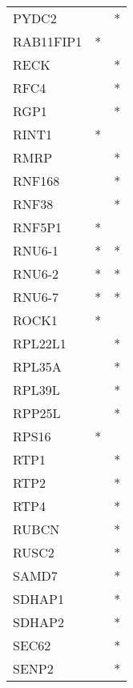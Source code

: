 \begin{longtable}{lcc}
PYDC2            &                &          * \\
RAB11FIP1        &              * &            \\
RECK             &                &          * \\
RFC4             &                &          * \\
RGP1             &                &          * \\
RINT1            &              * &            \\
RMRP             &                &          * \\
RNF168           &                &          * \\
RNF38            &                &          * \\
RNF5P1           &              * &            \\
RNU6-1           &              * &          * \\
RNU6-2           &              * &          * \\
RNU6-7           &              * &          * \\
ROCK1            &              * &            \\
RPL22L1          &                &          * \\
RPL35A           &                &          * \\
RPL39L           &                &          * \\
RPP25L           &                &          * \\
RPS16            &              * &            \\
RTP1             &                &          * \\
RTP2             &                &          * \\
RTP4             &                &          * \\
RUBCN            &                &          * \\
RUSC2            &                &          * \\
SAMD7            &                &          * \\
SDHAP1           &                &          * \\
SDHAP2           &                &          * \\
SEC62            &                &          * \\
SENP2            &                &          * \\

\end{longtable}
